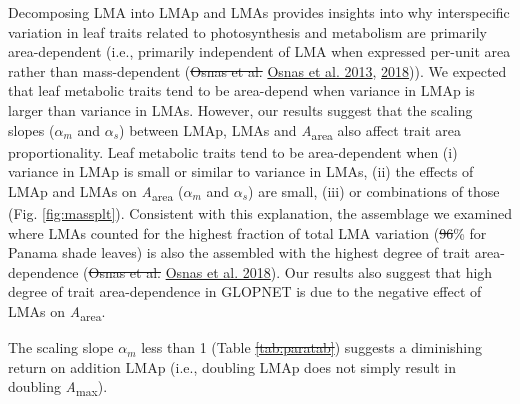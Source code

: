 \documentclass[
  12pt,
]{article}
\providecommand{\DIFaddtex}[1]{{\protect\color{blue}\uwave{#1}}} %
\providecommand{\DIFdeltex}[1]{{\protect\color{red}\sout{#1}}}                      %
\providecommand{\DIFaddbegin}{} %
\providecommand{\DIFaddend}{} %
\providecommand{\DIFdelbegin}{} %
\providecommand{\DIFdelend}{} %
\providecommand{\DIFadd}[1]{\texorpdfstring{\DIFaddtex{#1}}{#1}} %
\providecommand{\DIFdel}[1]{\texorpdfstring{\DIFdeltex{#1}}{}} %
\newcommand{\DIFscaledelfig}{0.5}
\newlength{\DIFdelgraphicswidth} %
\newlength{\DIFdelgraphicsheight} %
\newcommand{\DIFaddincludegraphics}[2][]{{\color{blue}\fbox{\DIFOincludegraphics[#1]{#2}}}} %
\newcommand{\DIFdelincludegraphics}[2][]{%
\sbox{\DIFdelgraphicsbox}{\DIFOincludegraphics[#1]{#2}}%
\settoboxwidth{\DIFdelgraphicswidth}{\DIFdelgraphicsbox} %
\settoboxtotalheight{\DIFdelgraphicsheight}{\DIFdelgraphicsbox} %
\scalebox{\DIFscaledelfig}{%
\parbox[b]{\DIFdelgraphicswidth}{\usebox{\DIFdelgraphicsbox}\\[-\baselineskip] \rule{\DIFdelgraphicswidth}{0em}}\llap{\resizebox{\DIFdelgraphicswidth}{\DIFdelgraphicsheight}{%
\setlength{\unitlength}{\DIFdelgraphicswidth}%
\begin{picture}(1,1)%
\thicklines\linethickness{2pt} %
{\color[rgb]{1,0,0}\put(0,0){\framebox(1,1){}}}%
{\color[rgb]{1,0,0}\put(0,0){\line( 1,1){1}}}%
{\color[rgb]{1,0,0}\put(0,1){\line(1,-1){1}}}%
\end{picture}%
}\hspace*{3pt}}} %
} %
\DeclareRobustCommand{\DIFaddbegin}{\DIFOaddbegin \let\includegraphics\DIFaddincludegraphics} %
\DeclareRobustCommand{\DIFaddend}{\DIFOaddend \let\includegraphics\DIFOincludegraphics} %
\DeclareRobustCommand{\DIFdelbegin}{\DIFOdelbegin \let\includegraphics\DIFdelincludegraphics} %
\DeclareRobustCommand{\DIFdelend}{\DIFOaddend \let\includegraphics\DIFOincludegraphics} %
\begin{document}
Decomposing LMA into LMAp and LMAs provides insights into why interspecific variation in leaf traits related to photosynthesis and metabolism are primarily area-dependent (i.e., primarily independent of LMA when expressed per-unit area rather than mass-dependent (\DIFdelbegin \DIFdel{Osnas et al. }\DIFdelend \protect\DIFdelbegin %
\DIFdelend \DIFaddbegin \hyperlink{ref-Osnas2013}{Osnas et al. 2013}\DIFaddend , \protect\hyperlink{ref-Osnas2018}{2018})).
We expected that leaf metabolic traits tend to be area-depend when variance in LMAp is larger than variance in LMAs.
However, our results suggest that the scaling slopes (\DIFdelbegin \DIFdel{\(\alpha_m\) }\DIFdelend \DIFaddbegin \DIFadd{\(\alpha_p\) }\DIFaddend and \(\alpha_s\)) between LMAp, LMAs and \emph{A}\textsubscript{area} also affect trait area proportionality.
Leaf metabolic traits tend to be area-dependent when (i) variance in LMAp is small or similar to variance in LMAs, (ii) the effects of LMAp and LMAs on \emph{A}\textsubscript{area} (\DIFdelbegin \DIFdel{\(\alpha_m\) }\DIFdelend \DIFaddbegin \DIFadd{\(\alpha_p\) }\DIFaddend and \(\alpha_s\)) are small, (iii) or combinations of those (Fig. \DIFaddbegin \DIFadd{Fig.~}\DIFaddend \ref{fig:massplt}).
Consistent with this explanation, the assemblage we examined where LMAs counted for the highest fraction of total LMA variation (\DIFdelbegin \DIFdel{96}\DIFdelend \DIFaddbegin \DIFadd{92}\DIFaddend \% for Panama shade leaves) is also the assembled with the highest degree of trait area-dependence (\DIFdelbegin \DIFdel{Osnas et al. }\DIFdelend \protect\DIFdelbegin %
\DIFdelend \DIFaddbegin \hyperlink{ref-Osnas2018}{Osnas et al. 2018}\DIFaddend ).
Our results also suggest that high degree of trait area-dependence in GLOPNET is due to the negative effect of LMAs on \emph{A}\textsubscript{area}.

The scaling slope \DIFdelbegin \DIFdel{\(\alpha_m\) }\DIFdelend \DIFaddbegin \DIFadd{\(\alpha_p\) }\DIFaddend less than 1 (Table \DIFdelbegin \DIFdel{\ref{tab:paratab}}\DIFdelend \DIFaddbegin \DIFadd{2}\DIFaddend ) suggests a diminishing return on addition LMAp (i.e., doubling LMAp does not simply result in doubling \emph{A}\textsubscript{max}).
\end{document}
